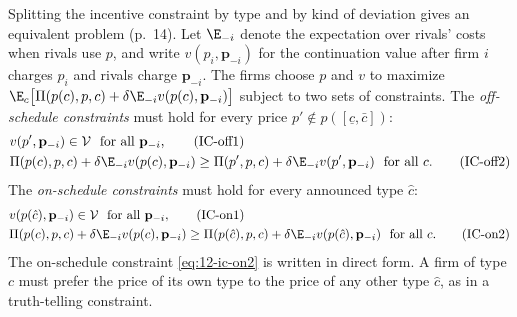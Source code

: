 Splitting the incentive constraint by type and by kind of deviation gives an equivalent problem (p.~14). Let
$\E_{-i}$ denote the expectation over rivals' costs when rivals use $p$, and write $v(p_i, \mathbf p_{-i})$ for the
continuation value after firm $i$ charges $p_i$ and rivals charge $\mathbf p_{-i}$. The firms choose $p$ and $v$ to
maximize $\E_c\bigl[\Pi(p(c), p, c) + \delta\E_{-i}v(p(c), \mathbf p_{-i})\bigr]$ subject to two sets of
constraints. The \emph{off-schedule constraints} must hold for every price $p' \notin p([\underline c, \bar c])$:
\begin{align}
& v(p', \mathbf p_{-i}) \in \mathcal V \ \text{ for all } \mathbf p_{-i}, \tag{IC-off1}\label{eq:12-ic-off1}\\
& \Pi(p(c), p, c) + \delta\E_{-i}v(p(c), \mathbf p_{-i}) \ge \Pi(p', p, c) + \delta\E_{-i}v(p', \mathbf p_{-i})
\ \text{ for all } c. \tag{IC-off2}\label{eq:12-ic-off2}
\end{align}
The \emph{on-schedule constraints} must hold for every announced type $\hat c$:
\begin{align}
& v(p(\hat c), \mathbf p_{-i}) \in \mathcal V \ \text{ for all } \mathbf p_{-i}, \tag{IC-on1}\label{eq:12-ic-on1}\\
& \Pi(p(c), p, c) + \delta\E_{-i}v(p(c), \mathbf p_{-i}) \ge \Pi(p(\hat c), p, c) + \delta\E_{-i}v(p(\hat c), \mathbf p_{-i})
\ \text{ for all } c . \tag{IC-on2}\label{eq:12-ic-on2}
\end{align}
The on-schedule constraint \eqref{eq:12-ic-on2} is written in direct form. A firm of type $c$ must prefer the price of
its own type to the price of any other type $\hat c$, as in a truth-telling constraint.

